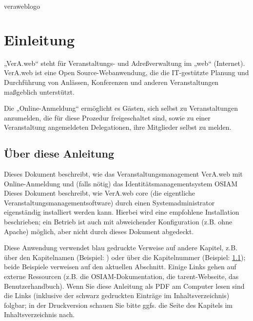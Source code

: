 \ifupgradeanleitung
 \ifoa
  \newcommand{\vwianame}{Upgradeanleitung VerA.web-full}
 \else%
  \newcommand{\vwianame}{Upgradeanleitung VerA.web-core}
 \fi%
\else%
 \ifoa
  \newcommand{\vwianame}{Installationsanleitung VerA.web-full}
 \else%
  \newcommand{\vwianame}{Installationsanleitung VerA.web-core}
 \fi%
\fi%

\tarentanleitung{\vwianame}{\vwiaverssw}
 {\vwiaversfassungnr}{\vwiaversfassungmonat}{\vwiaversfassungjahr}{veraweblogo}



\section{Einleitung}\label{sec:intro}

„VerA.web“ steht für Veranstaltungs- und Adreßverwaltung im „web“ (Internet).
VerA.web ist eine Open Source-Webanwendung, die die IT-gestützte Planung und
Durchführung von Anlässen, Konferenzen und anderen Veranstaltungen maßgeblich
unterstützt.

\ifoa
Die „Online-Anmeldung“ ermöglicht es Gästen, sich selbst zu Veranstaltungen
anzumelden, die für diese Prozedur freigeschaltet sind, sowie zu einer
Veranstaltung angemeldeten Delegationen, ihre Mitglieder selbst zu melden.
\fi%

\subsection{Über diese Anleitung}\label{subsec:aboutmanual}

\ifoa
Dieses Dokument beschreibt, wie das Veranstaltungsmanagement
VerA.web mit Online-Anmeldung und (falls nötig) das
Identitätsmanagementsystem OSIAM
\else%
Dieses Dokument beschreibt, wie VerA.web core (die eigentliche
Veranstaltungsmanagementsoftware)
\fi%
durch einen Systemadministrator
eigenständig installiert werden kann. Hierbei wird eine empfohlene
Installation beschrieben; ein Betrieb ist auch mit abweichender
Konfiguration (z.B. ohne Apache) möglich, aber nicht durch dieses
Dokument abgedeckt.

Diese Anwendung verwendet blau gedruckte Verweise auf andere Kapitel,
z.B. über den Kapitelnamen (Beispiel: )
oder über die Kapitelnummer (Beispiel: \ref{subsec:aboutmanual});
beide Beispiele verweisen auf den aktuellen Abschnitt. Einige Links
gehen auf externe Ressourcen (z.B. die OSIAM-Dokumentation, die
tarent-Webseite, das Benutzerhandbuch). Wenn Sie diese Anleitung als
PDF am Computer lesen sind die Links (inklusive der schwarz gedruckten
Einträge im Inhaltsverzeichnis) folgbar; in der Druckversion schauen
Sie bitte ggfs. die Seite des Kapitels im Inhaltsverzeichnis nach.

